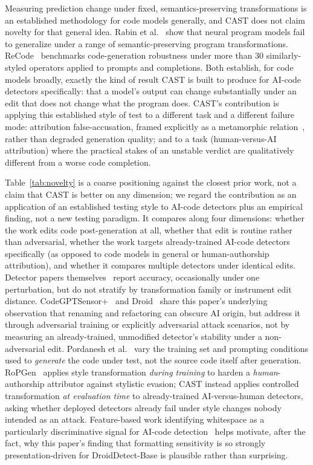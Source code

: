 \documentclass[sigconf,review,anonymous]{acmart}
\begin{document}
Measuring prediction change under fixed, semantics-preserving transformations is an established methodology for code models generally, and CAST does not claim novelty for that general idea. Rabin et al.~\cite{rabin} show that neural program models fail to generalize under a range of semantic-preserving program transformations. ReCode~\cite{recode} benchmarks code-generation robustness under more than 30 similarly-styled operators applied to prompts and completions. Both establish, for code models broadly, exactly the kind of result CAST is built to produce for AI-code detectors specifically: that a model's output can change substantially under an edit that does not change what the program does. CAST's contribution is applying this established style of test to a different task and a different failure mode: attribution false-accusation, framed explicitly as a metamorphic relation~\cite{metamorphicslr}, rather than degraded generation quality; and to a task (human-versus-AI attribution) where the practical stakes of an unstable verdict are qualitatively different from a worse code completion.

Table~\ref{tab:novelty} is a coarse positioning against the closest prior work, not a claim that CAST is better on any dimension; we regard the contribution as an application of an established testing style to AI-code detectors plus an empirical finding, not a new testing paradigm. It compares along four dimensions: whether the work edits code post-generation at all, whether that edit is routine rather than adversarial, whether the work targets already-trained AI-code detectors specifically (as opposed to code models in general or human-authorship attribution), and whether it compares multiple detectors under identical edits. Detector papers themselves~\cite{gptsniffer,llmsniffer,detectcodegpt,codegptsensor} report accuracy, occasionally under one perturbation, but do not stratify by transformation family or instrument edit distance. CodeGPTSensor+~\cite{codegptsensorplus} and Droid~\cite{droid} share this paper's underlying observation that renaming and refactoring can obscure AI origin, but address it through adversarial training or explicitly adversarial attack scenarios, not by measuring an already-trained, unmodified detector's stability under a non-adversarial edit. Pordanesh et al.~\cite{hidinginplainsight} vary the training set and prompting conditions used to \emph{generate} the code under test, not the source code itself after generation. RoPGen~\cite{ropgen} applies style transformation \emph{during training} to harden a \emph{human}-authorship attributor against stylistic evasion; CAST instead applies controlled transformation \emph{at evaluation time} to already-trained AI-versus-human detectors, asking whether deployed detectors already fail under style changes nobody intended as an attack. Feature-based work identifying whitespace as a particularly discriminative signal for AI-code detection~\cite{whitespaces} helps motivate, after the fact, why this paper's finding that formatting sensitivity is so strongly presentation-driven for DroidDetect-Base is plausible rather than surprising.
\end{document}
